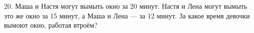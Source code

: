 20. Маша и Настя могут вымыть окно за 20 минут. Настя и Лена могут вымыть это же окно за 15 минут, а Маша и Лена --- за 12 минут. За какое время девочки вымоют окно, работая втроём?\\
